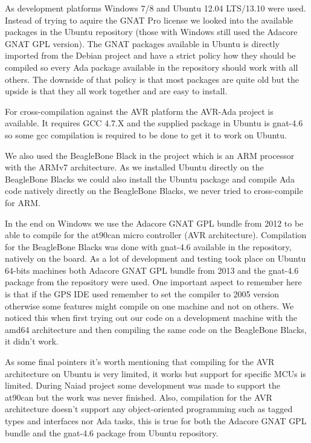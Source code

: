 As development platforms Windows 7/8 and Ubuntu 12.04 LTS/13.10 were used. Instead
of trying to aquire the GNAT Pro license we looked into the available packages
in the Ubuntu repository (those with Windows still used the Adacore GNAT GPL version).
The GNAT packages available in Ubuntu is directly imported from the Debian
project and have a strict policy \cite{web:debian_ada_policy} how they should
be compiled so every Ada package available in the repository should work with all others.
The downside of that policy is that most packages are quite old but the upside
is that they all work together and are easy to install.

For cross-compilation against the AVR platform the AVR-Ada project \cite{web:avr-ada}
is available. It requires GCC 4.7.X and the supplied package in Ubuntu is gnat-4.6 so some
gcc compilation is required to be done to get it to work on Ubuntu.

We also used the BeagleBone Black in the project which is an ARM processor with
the ARMv7 architecture. As we installed Ubuntu directly on the BeagleBone Blacks
we could also install the Ubuntu package and compile Ada code natively directly
on the BeagleBone Blacks, we never tried to cross-compile for ARM.

In the end on Windows we use the Adacore GNAT GPL bundle from 2012 to be able
to compile for the at90can micro controller (AVR architecture). Compilation for
the BeagleBone Blacks was done with gnat-4.6 available in the repository, natively
on the board. As a lot of development and testing took place on Ubuntu 64-bits
machines both Adacore GNAT GPL bundle from 2013 and the gnat-4.6 package from the
repository were used. One important aspect to remember here is that if the GPS
IDE used remember to set the compiler to 2005 version otherwise some features
might compile on one machine and not on others. We noticed this when first trying
out our code on a development machine with the amd64 architecture and then compiling
the same code on the BeagleBone Blacks, it didn't work.

As some final pointers it's worth mentioning that compiling for the AVR architecture
on Ubuntu is very limited, it works but support for specific MCUs is limited. During
Naiad project some development was made to support the at90can but the work was
never finished. Also, compilation for the AVR architecture doesn't support any
object-oriented programming such as tagged types and interfaces nor Ada tasks, this
is true for both the Adacore GNAT GPL bundle and the gnat-4.6 package from Ubuntu
repository.

